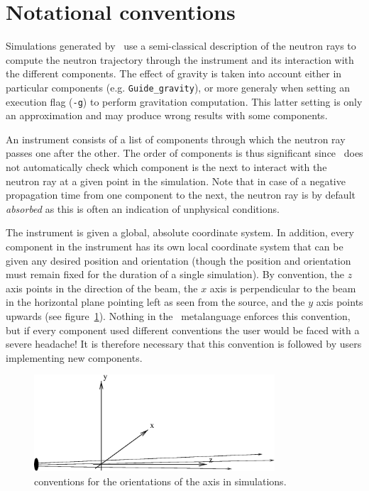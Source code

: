 \section{Notational conventions}

Simulations generated by \MCS\ use a semi-classical description of the
neutron rays to compute the neutron trajectory through the instrument and its
interaction with the different components. The effect of gravity is
taken  into account either in particular components (e.g. \verb+Guide_gravity+), or more generaly
when setting an execution flag (\verb+-g+) to perform gravitation
computation. This latter setting is only an approximation and may produce
wrong results with some components.

An instrument consists of a list of components through which the neutron
ray passes one after the other. The order of components is thus significant
since \MCS\ does not automatically check which component is the next to
interact with the neutron ray at a given point in the simulation. Note
that in case of a negative propagation time from one component to the
next, the neutron ray is by default \emph{absorbed} as this is often
an indication of unphysical conditions.

The instrument is given a global, absolute coordinate system. In
addition, every component in the instrument has its own local coordinate
system that can be given any desired position and orientation (though
the position and orientation must remain fixed for the duration of a
single simulation). 
By convention, the $z$ axis points in the direction of the beam, the $x$ axis
is perpendicular to the beam in the horizontal plane pointing left as seen
from the source, and the $y$ axis points upwards (see figure~\ref{f:axis}).
Nothing in the \MCS\ metalanguage enforces this convention, but if every component used
different conventions the user would be faced with a severe headache! It is
therefore necessary that this convention is followed by users implementing
new components.
\begin{figure}
  \begin{center}
    \includegraphics[width=0.8\textwidth]{figures/axis-conventions.eps}
  \end{center}
\caption{conventions for the orientations of the axis in simulations.}
\label{f:axis}
\end{figure}

